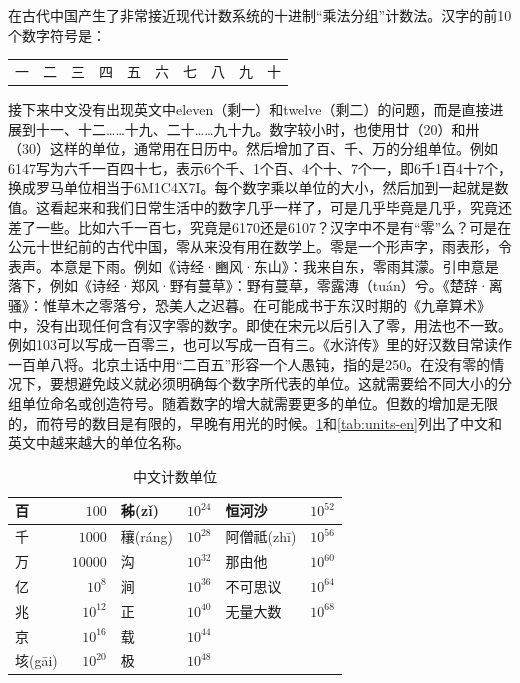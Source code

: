 \documentclass[b5paper]{ctexart}
\begin{document}
在古代中国产生了非常接近现代计数系统的十进制“乘法分组”计数法。汉字的前10个数字符号是：

\begin{center}
\begin{tabular}{cccccccccc}
一 & 二 & 三 & 四 & 五 & 六 & 七 & 八 & 九 & 十 \\
\end{tabular}
\end{center}

接下来中文没有出现英文中eleven（剩一）和twelve（剩二）的问题，而是直接进展到十一、十二……十九、二十……九十九。数字较小时，也使用廿（20）和卅（30）这样的单位，通常用在日历中。然后增加了百、千、万的分组单位。例如6147写为六千一百四十七，表示6个千、1个百、4个十、7个一，即6千1百4十7个，换成罗马单位相当于6M1C4X7I。每个数字乘以单位的大小，然后加到一起就是数值。这看起来和我们日常生活中的数字几乎一样了，可是几乎毕竟是几乎，究竟还差了一些。比如六千一百七，究竟是6170还是6107？汉字中不是有“零”么？可是在公元十世纪前的古代中国，零从来没有用在数学上。零是一个形声字，雨表形，令表声。本意是下雨。例如《诗经·豳风·东山》：我来自东，零雨其濛。引申意是落下，例如《诗经·郑风·野有蔓草》：野有蔓草，零露漙（tu\'{a}n）兮。《楚辞·离骚》：惟草木之零落兮，恐美人之迟暮。在可能成书于东汉时期的《九章算术》中，没有出现任何含有汉字零的数字。即使在宋元以后引入了零，用法也不一致。例如103可以写成一百零三，也可以写成一百有三。《水浒传》里的好汉数目常读作一百单八将。北京土话中用“二百五”形容一个人愚钝，指的是250。在没有零的情况下，要想避免歧义就必须明确每个数字所代表的单位。这就需要给不同大小的分组单位命名或创造符号。随着数字的增大就需要更多的单位。但数的增加是无限的，而符号的数目是有限的，早晚有用光的时候。\cref{tab:units-cn}和\cref{tab:units-en}列出了中文和英文中越来越大的单位名称。

\begin{table}[htbp]
\centering
  \begin{tabular}{|l|r|l|r|l|r|}
  \hline
  百            & $100$      & 秭(z\v{i})    & $10^{24}$ &  恒河沙  & $10^{52}$ \\
  \hline
  千            & $1000$     & 穰(r\'{a}ng)  & $10^{28}$ & 阿僧祗(zh\={i})  & $10^{56}$ \\
  \hline
  万            & $10000$    & 沟            & $10^{32}$ & 那由他        & $10^{60}$  \\
  \hline
  亿            & $10^8$     & 涧            & $10^{36}$ &  不可思议      & $10^{64}$ \\
  \hline
  兆            & $10^{12}$  & 正            & $10^{40}$ &  无量大数      & $10^{68}$ \\
  \hline
  京            & $10^{16}$  & 载            & $10^{44}$ &               & \\
  \hline
  垓(g\={a}i)   & $10^{20}$  & 极            & $10^{48}$ &               & \\
  \hline
  \end{tabular}
  \caption{中文计数单位}
  \label{tab:units-cn}
\end{table}
\end{document}
